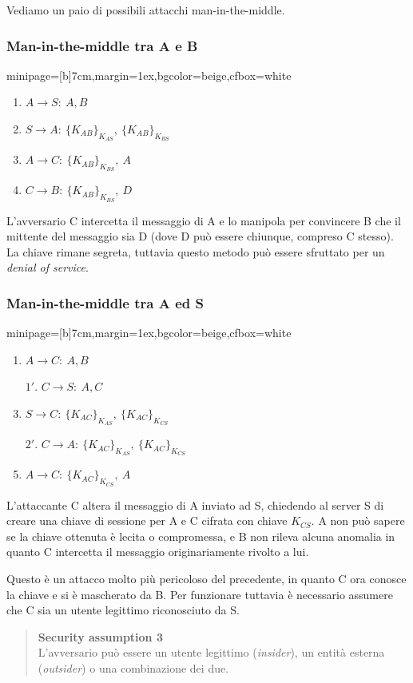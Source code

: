 \documentclass[a4paper, 11pt, notitlepage, fleqn]{report}
\newcommand{\fromto}[2]{#1\rightarrow #2\!:\ }
\newenvironment{colbox}[2]%
{%
	\par\noindent\hspace{10pt}
	\begin{adjustbox}{minipage=[b]{#2},margin=1ex,bgcolor=#1,cfbox=white}
}{%
	\end{adjustbox}\newline%
}
\begin{document}
\noindent Vediamo un paio di possibili attacchi man-in-the-middle.
\subsubsection{Man-in-the-middle tra A e B}
\begin{colbox}{beige}{7cm}
	\begin{enumerate}
		\item $\fromto{A}{S}A, B$
		\item $\fromto{S}{A}\{K_{AB}\}_{K_{AS}},\ \{K_{AB}\}_{K_{BS}}$
		\item $\fromto{A}{C}\{K_{AB}\}_{K_{BS}},\ A$
		\item $\fromto{C}{B}\{K_{AB}\}_{K_{BS}},\ D$
	\end{enumerate}
\end{colbox}
L'avversario C intercetta il messaggio di A e lo manipola per convincere B che il mittente del messaggio sia D (dove D può essere chiunque, compreso C stesso). La chiave rimane segreta, tuttavia questo metodo può essere sfruttato per un \emph{denial of service}.

\subsubsection{Man-in-the-middle tra A ed S}
\begin{colbox}{beige}{7cm}
	\begin{enumerate}
		\item $\fromto{A}{C}A, B$
		\item[$1'$.] $\fromto{C}{S}A, C$
		\item $\fromto{S}{C}\{K_{AC}\}_{K_{AS}},\ \{K_{AC}\}_{K_{CS}}$
		\item[$2'$.] $\fromto{C}{A}\{K_{AC}\}_{K_{AS}},\ \{K_{AC}\}_{K_{CS}}$
		\item $\fromto{A}{C}\{K_{AC}\}_{K_{CS}},\ A$
	\end{enumerate}
\end{colbox}
L'attaccante C altera il messaggio di A inviato ad S, chiedendo al server S di creare una chiave di sessione per A e C cifrata con chiave $K_{CS}$. A non può sapere se la chiave ottenuta è lecita o compromessa, e B non rileva alcuna anomalia in quanto C intercetta il messaggio originariamente rivolto a lui.

Questo è un attacco molto più pericoloso del precedente, in quanto C ora conosce la chiave e si è mascherato da B. Per funzionare tuttavia è necessario assumere che C sia un utente legittimo riconosciuto da S.
\begin{quote}
	\textbf{Security assumption 3}\\
	L'avversario può essere un utente legittimo (\emph{insider}), un entità esterna (\emph{outsider}) o una combinazione dei due.
\end{quote}
\end{document}
